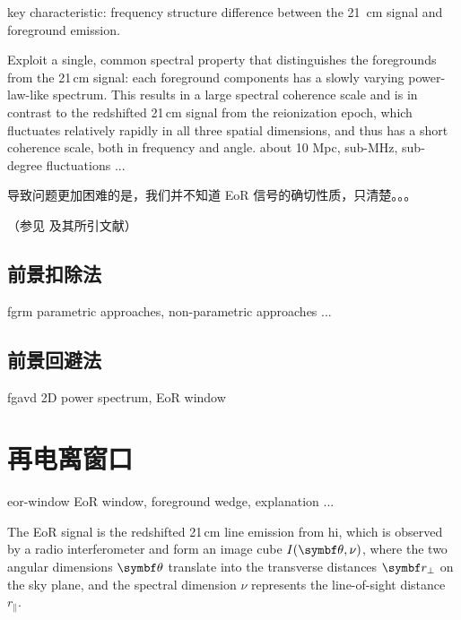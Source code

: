 key characteristic: frequency structure difference between
the 21~cm signal and foreground emission.

Exploit a single, common spectral property that distinguishes the
foregrounds from the 21\,cm signal: each foreground components has
a slowly varying power-law-like spectrum.
This results in a large spectral coherence scale and is in contrast
to the redshifted 21\,cm signal from the reionization epoch, which
fluctuates relatively rapidly in all three spatial dimensions, and
thus has a short coherence scale, both in frequency and angle.
about 10 Mpc, sub-MHz, sub-degree fluctuations ...
\cite{morales2004,bowman2009}

导致问题更加困难的是，我们并不知道 EoR 信号的确切性质，只清楚。。。

（参见  及其所引文献）

\subsection{前景扣除法}
\label{sec:fgrm}

\acl{fgrm}
parametric approaches, non-parametric approaches ...

\subsection{前景回避法}
\label{sec:fgavd}

\acl{fgavd}
2D power spectrum, EoR window


\section{再电离窗口}
\label{sec:eor-window}

\acl{eor-window}
EoR window, foreground wedge, explanation ...

The EoR signal is the redshifted 21\,cm line emission from \acs{hi},
which is observed by a radio interferometer and form an image cube
$I(\B{\theta}, \nu)$, where the two angular dimensions $\B{\theta}$
translate into the transverse distances $\B{r}_{\bot}$ on the sky plane,
and the spectral dimension $\nu$ represents the line-of-sight distance
$r_{\parallel}$.

